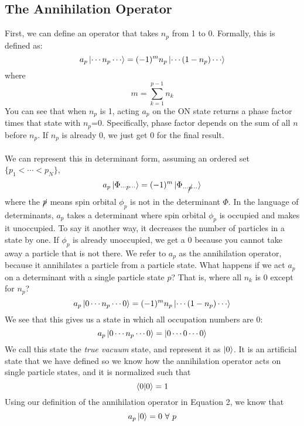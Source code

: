 \documentclass{article}
\begin{document}
\subsection{The Annihilation Operator} 
First, we can define an operator that takes $n_p$ from 1 to 0.
Formally, this is defined as: 
\begin{equation}
a_p \ket{\cdots n_p \cdots} = (-1)^{m} n_p \ket{\cdots (1-n_p) \cdots} 
\end{equation}
where 
\[m = \sum_{k=1}^{p-1} n_k \]
You can see that when $n_p$ is 1, acting $a_p$ on the ON state returns a phase factor times that state with $n_p$=0. 
Specifically, phase factor depends on the sum of all $n$ before $n_p$. 
If $n_p$ is already 0, we just get 0 for the final result. \\ \\
We can represent this in determinant form, assuming an ordered set $\{p_1 < \cdots  < p_N\}$,
\[a_p \ket{\Phi_{\cdots p \cdots}} = (-1)^m  \ket{\Phi_{\cdots \cancel{p} \cdots }} \]
where the $\cancel{p}$ means spin orbital $\phi_p$ is not in the determinant $\Phi$.
In the language of determinants, $a_p$ takes a determinant where spin orbital $\phi_p$ is occupied and makes it unoccupied. 
To say it another way, it decreases the number of particles in a state by one. 
If $\phi_p$ is already unoccupied, we get a 0 because you cannot take away a particle that is not there.
We refer to $a_p$ as the annihilation operator, because it annihilates a particle from a particle state. 
What happens if we act $a_p$ on a determinant with a single particle state $p$? 
That is, where all $n_k$ is 0 except for $n_p$? 
\[a_p \ket{0 \cdots n_p \cdots0} = (-1)^{m} n_p \ket{\cdots (1-n_p) \cdots}  \]
We see that this gives us a state in which all occupation numbers are 0:
\[a_p \ket{0 \cdots n_p \cdots0} = \ket{0 \cdots 0 \cdots 0}  \]
We call this state the \textit{true vacuum} state, and represent it as $\ket{0}$. 
It is an artificial state that we have defined so we know how the annihilation operator acts on single particle states, and it is normalized such that 
\[\braket{0 | 0} = 1\]
Using our definition of the annihilation operator in Equation 2, we know that 
\[a_p \ket{0} = 0 \,  \, \forall \, \, p \]
\end{document}
